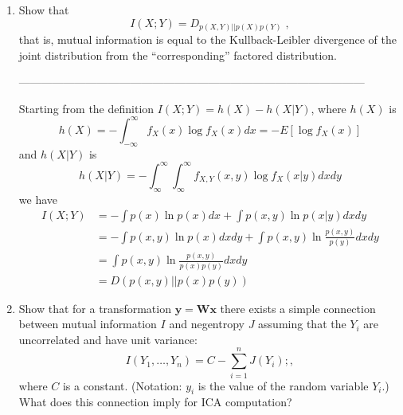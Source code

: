 \documentclass[10pt]{article}
\renewcommand{\vec}[1]{\mathbf{#1}}
\newcommand{\x}{\vec{x}}
\newcommand{\bSigma}{\boldsymbol{\Sigma}}
\begin{document}
\begin{enumerate}


\vspace{2mm}

\vspace{2cm}
\item Show that
\begin{displaymath}
  I(X;Y) = D_{p(X,Y)||p(X)p(Y)} \; ,
\end{displaymath}
that is, mutual information is equal to the Kullback-Leibler
divergence of the joint distribution from the ``corresponding''
factored distribution.

---------------------------------------------------------------------------------------------

Starting from the definition $I(X; Y) = h(X) - h(X | Y)$, where $h(X)$
is
\[
h(X) = -\int_{-\infty}^{\infty} f_X(x) \log f_X(x)dx = -E[\log f_X(x)]
\] 
and $h(X|Y)$ is
\[
h(X|Y)=-\int_{\infty}^{\infty}\int_{\infty}^{\infty}f_{X,Y}(x,y)\log
f_X(x|y) dx dy
\]
we have
\begin{equation}
\begin{split}
I(X; Y) &= -\int p(x) \ln p(x) dx + \int p(x, y) \ln p(x | y) dx dy\\ 
    &= -\int p(x, y) \ln p(x) dx dy + \int p(x, y) \ln \frac{p(x, y)}{p(y)} dx dy\\ 
    &= \int p(x, y) \ln \frac{p(x, y)}{p(x) p(y)} dx dy \\
    &= D(p(x, y) || p(x)p(y))
\end{split}
\end{equation}


\vspace{2mm}

\vspace{2cm}
\item Show that for a transformation $\mathbf{y} = \mathbf{W}
  \mathbf{x}$ there exists a simple connection between mutual information $I$
  and negentropy $J$ assuming that the $Y_i$ are uncorrelated and have
  unit variance:
  \[
  I(Y_1, \ldots , Y_n) = C - \sum_{i=1}^n J(Y_i) ; ,
  \]
  where $C$ is a constant. (Notation: $y_i$ is the value of the random
  variable $Y_i$.) What does this connection imply for ICA computation?


\end{enumerate}
\end{document}
